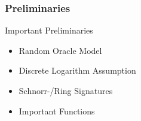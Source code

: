 \begin{frame}
	\frametitle{Preliminaries}

	Important Preliminaries

	\begin{itemize}
		\item Random Oracle Model
		\item Discrete Logarithm Assumption
		\item Schnorr-/Ring Signatures
		\item Important Functions
	\end{itemize}
\end{frame}